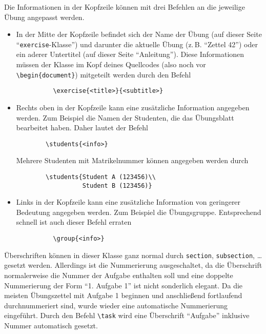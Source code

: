 \documentclass{exercise}
\begin{document}
    Die Informationen in der Kopfzeile können mit drei Befehlen an die jeweilige Übung angepasst werden.
    \begin{itemize}
      \item In der Mitte der Kopfzeile befindet sich der Name der Übung (auf dieser Seite \enquote{\texttt{exercise}-Klasse}) und darunter die aktuelle Übung (z.\,B. \enquote{Zettel 42}) oder ein aderer Untertitel (auf dieser Seite \enquote{Anleitung}). Diese Informationen müssen der Klasse im Kopf deines Quellcodes (also noch vor \verb-\begin{document}-) mitgeteilt werden durch den Befehl
        \begin{verbatim}
          \exercise{<title>}{<subtitle>}  
        \end{verbatim}
        
      \item Rechts oben in der Kopfzeile kann eine zusätzliche Information angegeben werden. Zum Beispiel die Namen der Studenten, die das Übungsblatt bearbeitet haben. Daher lautet der Befehl
      \begin{verbatim}
        \students{<info>} 
      \end{verbatim}
      Mehrere Studenten mit Matrikelnummer können angegeben werden durch
      \begin{verbatim}
        \students{Student A (123456)\\
                  Student B (123456)}
      \end{verbatim}
        
      \item Links in der Kopfzeile kann eine zusätzliche Information von geringerer Bedeutung angegeben werden. Zum Beispiel die Übungsgruppe. Entsprechend schnell ist auch dieser Befehl erraten
        \begin{verbatim}
          \group{<info>}
        \end{verbatim}
    \end{itemize}
    
    Überschriften können in dieser Klasse ganz normal durch \texttt{section}, \texttt{subsection}, \ldots gesetzt werden. Allerdings ist die Nummerierung ausgeschaltet, da die Überschrift normalerweise die Nummer der Aufgabe enthalten soll und eine doppelte Nummerierung der Form \enquote{1. Aufgabe 1} ist nicht sonderlich elegant. Da die meisten Übungszettel mit Aufgabe 1 beginnen und anschließend fortlaufend durchnummeriert sind, wurde wieder eine automatische Nummerierung eingeführt. Durch den Befehl \verb-\task- wird eine Überschrift \enquote{Aufgabe} inklusive Nummer automatisch gesetzt.
    
\end{document}
